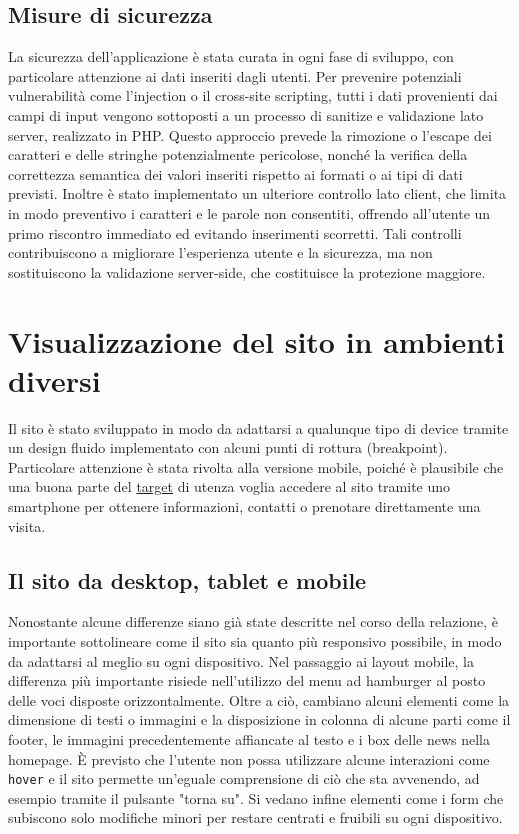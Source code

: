 \documentclass{article}
\begin{document}
\subsection{Misure di sicurezza}
La sicurezza dell'applicazione è stata curata in ogni fase di sviluppo, con particolare attenzione ai dati inseriti dagli utenti. Per prevenire potenziali vulnerabilità come l'injection o il cross-site scripting, tutti i dati provenienti dai campi di input vengono sottoposti a un processo di sanitize e validazione lato server, realizzato in PHP. Questo approccio prevede la rimozione o l'escape dei caratteri e delle stringhe potenzialmente pericolose, nonché la verifica della correttezza semantica dei valori inseriti rispetto ai formati o ai tipi di dati previsti. Inoltre è stato implementato un ulteriore controllo lato client, che limita in modo preventivo i caratteri e le parole non consentiti, offrendo all'utente un primo riscontro immediato ed evitando inserimenti scorretti. Tali controlli contribuiscono a migliorare l'esperienza utente e la sicurezza, ma non sostituiscono la validazione server-side, che costituisce la protezione maggiore.
\section{Visualizzazione del sito in ambienti diversi}
Il sito è stato sviluppato in modo da adattarsi a qualunque tipo di device tramite un design fluido implementato con alcuni punti di rottura (breakpoint). Particolare attenzione è stata rivolta alla versione mobile, poiché è plausibile che una buona parte del \hyperref[target]{target} di utenza voglia accedere al sito tramite uno smartphone per ottenere informazioni, contatti o prenotare direttamente una visita.
\subsection{Il sito da desktop, tablet e mobile} \label{desktoptabletmobile}
Nonostante alcune differenze siano già state descritte nel corso della relazione, è importante sottolineare come il sito sia quanto più responsivo possibile, in modo da adattarsi al meglio su ogni dispositivo. Nel passaggio ai layout mobile, la differenza più importante risiede nell'utilizzo del menu ad hamburger al posto delle voci disposte orizzontalmente. Oltre a ciò, cambiano alcuni elementi come la dimensione di testi o immagini e la disposizione in colonna di alcune parti come il footer, le immagini precedentemente affiancate al testo e i box delle news nella homepage. È previsto che l'utente non possa utilizzare alcune interazioni come \verb|hover| e il sito permette un'eguale comprensione di ciò che sta avvenendo, ad esempio tramite il pulsante "torna su". Si vedano infine elementi come i form che subiscono solo modifiche minori per restare centrati e fruibili su ogni dispositivo.
\end{document}
